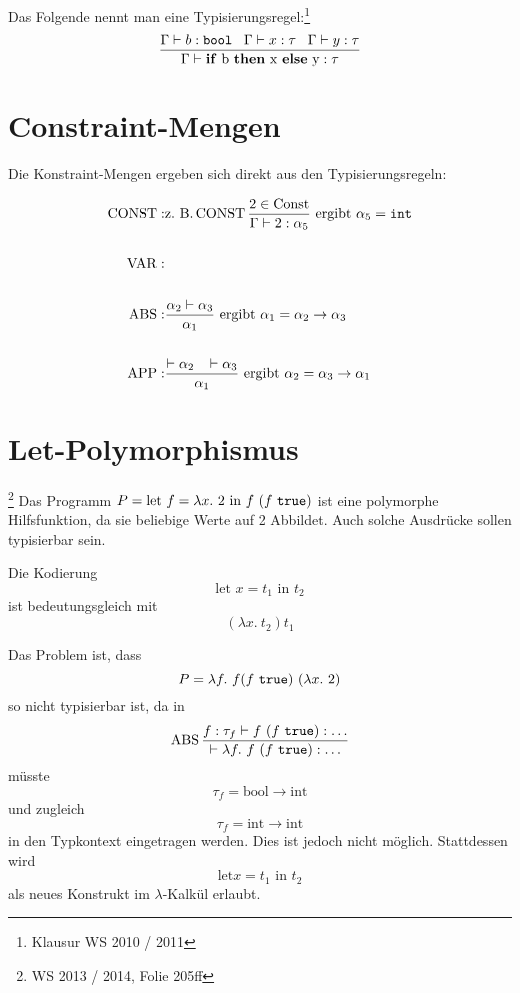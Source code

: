 \begin{beispiel}[Typisierungsregel]%
	Das Folgende nennt man eine Typisierungsregel:\footnote{Klausur WS 2010 / 2011}
	\[\frac{\Gamma \vdash b: \text{\texttt{bool}}\;\;\; \Gamma \vdash x: \tau \;\;\; \Gamma \vdash y: \tau }{\Gamma \vdash \text{\textbf{if} b \textbf{then} x \textbf{else} y} : \tau}\]
\end{beispiel}

\section{Constraint-Mengen}
Die Konstraint-Mengen ergeben sich direkt aus den Typisierungsregeln:

    \begin{align*}
        \operatorname{CONST}:&\text{z.~B.} \operatorname{CONST} \frac{2 \in \text{Const}}{\Gamma \vdash 2 : \alpha_5} \text{ ergibt } \alpha_5 = \text{\texttt{int}}\\
               &\\
        \operatorname{VAR}:  &\\
               &\\
        \operatorname{ABS}:  &\frac{\alpha_2 \vdash \alpha_3}{\alpha_1} \text{ ergibt } \alpha_1 = \alpha_2 \rightarrow \alpha_3\\
               &\\
        \operatorname{APP}:  &\frac{\vdash \alpha_2 \;\;\; \vdash \alpha_3}{\alpha_1} \text{ ergibt } \alpha_2 = \alpha_3 \rightarrow \alpha_1\\
    \end{align*}

\section{Let-Polymorphismus}\footnote{WS 2013 / 2014, Folie 205ff}%
Das Programm $P = \text{let } f = \lambda x.\ 2 \text{ in } f\ (f\ \text{\texttt{true}})$
ist eine polymorphe Hilfsfunktion, da sie beliebige Werte auf 2 Abbildet.
Auch solche Ausdrücke sollen typisierbar sein.

Die Kodierung
\[\text{let } x = t_1 \text{ in } t_2\]
ist bedeutungsgleich mit
\[(\lambda x.\ t_2) t_1\]

Das Problem ist, dass
\[P = \lambda f. \ f (f\ \text{\texttt{true}})\ (\lambda x.\ 2)\]
so nicht typisierbar ist, da in
\[\ABS \frac{f: \tau_f \vdash f\ (f\ \text{\texttt{true}}): \dots}{\vdash \lambda f.\ f\ (f\ \text{\texttt{true}}): \dots}\]
müsste
\[\tau_f = \text{bool} \rightarrow \text{int}\]
und zugleich
\[\tau_f = \text{int} \rightarrow \text{int}\]
in den Typkontext eingetragen werden. Dies ist jedoch nicht möglich. Stattdessen
wird
\[\text{let} x = t_1 \text{ in } t_2\]
als neues Konstrukt im $\lambda$-Kalkül erlaubt.

